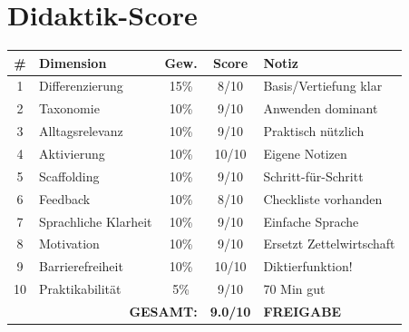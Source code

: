 \documentclass[11pt,a4paper]{article}
\begin{document}
\section{Didaktik-Score}

\begin{scorebox}
\begin{tabular}{|c|l|c|c|p{3.5cm}|}
\hline
\# & Dimension & Gew. & Score & Notiz \\
\hline
1 & Differenzierung & 15\% & 8/10 & Basis/Vertiefung klar \\
2 & Taxonomie & 10\% & 9/10 & Anwenden dominant \\
3 & Alltagsrelevanz & 10\% & 9/10 & Praktisch nützlich \\
4 & Aktivierung & 10\% & 10/10 & Eigene Notizen \\
5 & Scaffolding & 10\% & 9/10 & Schritt-für-Schritt \\
6 & Feedback & 10\% & 8/10 & Checkliste vorhanden \\
7 & Sprachliche Klarheit & 10\% & 9/10 & Einfache Sprache \\
8 & Motivation & 10\% & 9/10 & Ersetzt Zettelwirtschaft \\
9 & Barrierefreiheit & 10\% & 10/10 & Diktierfunktion! \\
10 & Praktikabilität & 5\% & 9/10 & 70 Min gut \\
\hline
\multicolumn{3}{|r|}{\textbf{GESAMT:}} & \textbf{9.0/10} & \textcolor{successgreen}{\textbf{FREIGABE}} \\
\hline
\end{tabular}
\end{scorebox}
\end{document}
